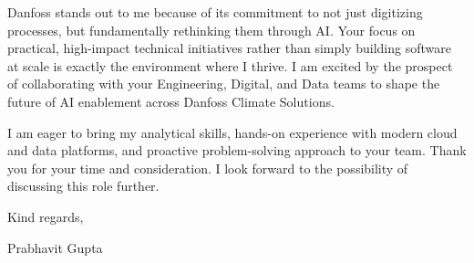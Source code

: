 \documentclass[11pt,a4paper]{article}
\begin{document}
\vspace{0.3cm}

\noindent Danfoss stands out to me because of its commitment to not just digitizing processes, but fundamentally rethinking them through AI. Your focus on practical, high-impact technical initiatives rather than simply building software at scale is exactly the environment where I thrive. I am excited by the prospect of collaborating with your Engineering, Digital, and Data teams to shape the future of AI enablement across Danfoss Climate Solutions.

\vspace{0.3cm}

\noindent I am eager to bring my analytical skills, hands-on experience with modern cloud and data platforms, and proactive problem-solving approach to your team. Thank you for your time and consideration. I look forward to the possibility of discussing this role further.

\vspace{0.5cm}

\noindent Kind regards,

\vspace{0.3cm}

\noindent Prabhavit Gupta
\end{document}
